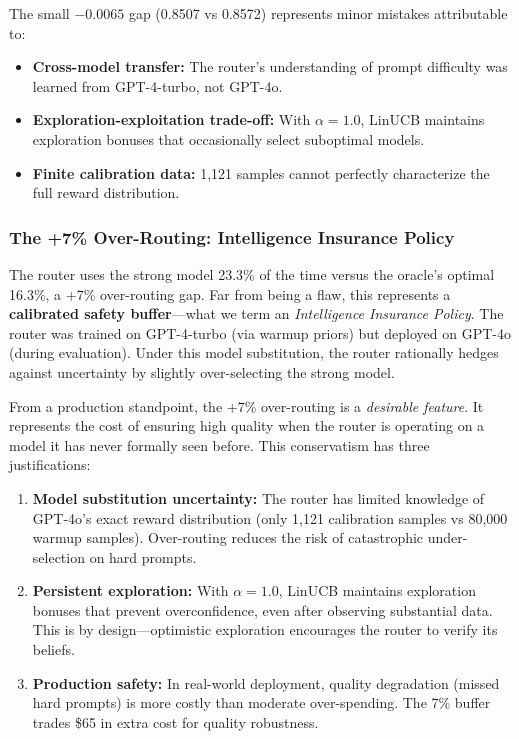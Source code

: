 The small $-0.0065$ gap (0.8507 vs 0.8572) represents minor mistakes attributable to:
\begin{itemize}
    \item \textbf{Cross-model transfer:} The router's understanding of prompt difficulty was learned from GPT-4-turbo, not GPT-4o.
    \item \textbf{Exploration-exploitation trade-off:} With $\alpha = 1.0$, LinUCB maintains exploration bonuses that occasionally select suboptimal models.
    \item \textbf{Finite calibration data:} 1,121 samples cannot perfectly characterize the full reward distribution.
\end{itemize}

\subsubsection{The +7\% Over-Routing: Intelligence Insurance Policy}

The router uses the strong model 23.3\% of the time versus the oracle's optimal 16.3\%, a +7\% over-routing gap. Far from being a flaw, this represents a \textbf{calibrated safety buffer}—what we term an \emph{Intelligence Insurance Policy}. The router was trained on GPT-4-turbo (via warmup priors) but deployed on GPT-4o (during evaluation). Under this model substitution, the router rationally hedges against uncertainty by slightly over-selecting the strong model.

From a production standpoint, the +7\% over-routing is a \emph{desirable feature}. It represents the cost of ensuring high quality when the router is operating on a model it has never formally seen before. This conservatism has three justifications:
\begin{enumerate}
    \item \textbf{Model substitution uncertainty:} The router has limited knowledge of GPT-4o's exact reward distribution (only 1,121 calibration samples vs 80,000 warmup samples). Over-routing reduces the risk of catastrophic under-selection on hard prompts.
    
    \item \textbf{Persistent exploration:} With $\alpha = 1.0$, LinUCB maintains exploration bonuses that prevent overconfidence, even after observing substantial data. This is by design—optimistic exploration encourages the router to verify its beliefs.
    
    \item \textbf{Production safety:} In real-world deployment, quality degradation (missed hard prompts) is more costly than moderate over-spending. The 7\% buffer trades \$65 in extra cost for quality robustness.
\end{enumerate}

